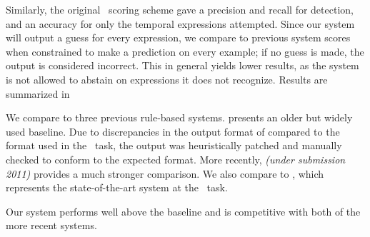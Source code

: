 Similarly, the original \tempeval\ scoring scheme gave a precision 
	and recall for detection, and an accuracy for only the temporal expressions 
	attempted.
Since our system will output a guess for every expression, we compare to 
	previous system scores when constrained to make a prediction on every
	example; if no guess is made, the output is considered incorrect.
This in general yields lower results, as the system is not allowed to
	abstain on expressions it does not recognize.
Results are summarized in 

We compare to three previous rule-based systems.
 \cite{key:2000mani-temporal} presents an older but widely
	used baseline.
Due to discrepancies in the output format of  compared to the 
	format used in the \tempeval\ task, the output was heuristically patched
	and manually checked to conform to the expected format.
More recently,  \textit{(under submission 2011)} 
	provides a much stronger comparison.
We also compare to  \cite{key:2010strotgen-temporal}, 
	which represents the state-of-the-art system at the \tempeval\ task.

Our system performs well above the  baseline and is competitive
	with both of the more recent systems.



